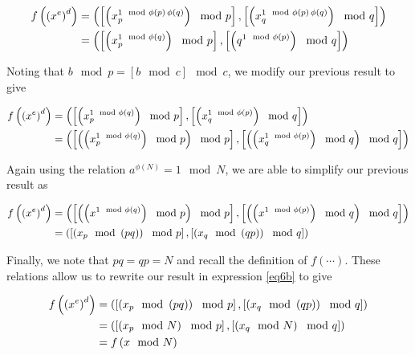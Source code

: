 \documentclass[../CryptoHW3.tex]{subfiles}
\begin{document}
\begin{flushleft}
\begin{align}
  f \left( \left( x^e \right)^d \right) &= \left( \left[ \left( x_p^{1 \mod \phi \left( p \right) \, \phi \left( q \right)} \right) \mod p \right], \left[ \left( x_	q^{1 \mod \phi \left( p \right) \, \phi \left( q \right)} \right) \mod q \right] \right) \notag \\
  &= \left( \left[ \left( x_p^{1 \mod \phi \left( q \right)} \right) \mod p \right], \left[ \left( q^{1 \mod \phi \left( p \right)} \right) \mod q \right] \right) \notag
\end{align}

Noting that $b \mod p = \left[ b \mod c \right] \mod c$, we modify our previous result to give

\begin{align}
  f \left( \left( x^e \right)^d \right) &= \left( \left[ \left( x_p^{1 \mod \phi \left( q \right)} \right) \mod p \right], \left[ \left( x_q^{1 \mod \phi \left( p \right)} \right) \mod q \right] \right) \notag \\
  &= \left( \left[ \left( \left( x_p^{1 \mod \phi \left( q \right)} \right) \mod p \right) \mod p \right], \left[ \left( \left( x_q^{1 \mod \phi \left( p \right)} \right) \mod q \right) \mod q \right] \right) \notag
\end{align}

Again using the relation $a^{\phi \left( N \right)} = 1 \mod N$, we are able to simplify our previous result as

\begin{align}
  f \left( \left( x^e \right)^d \right) &= \left( \left[ \left( \left( x^{1 \mod \phi \left( q \right)} \right) \mod p \right) \mod p \right], \left[ \left( \left( x^{1 \mod \phi \left( p \right)} \right) \mod q \right) \mod q \right] \right) \notag \\
  &= \left( \left[ \left( x_p \mod \left( p q \right) \right) \mod p \right], \left[ \left( x_q \mod \left( q p \right) \right) \mod q \right] \right) \label{eq6b}
\end{align}

Finally, we note that $p q = q p = N$ and recall the definition of $f \left( \cdots \right)$.  These relations allow us to rewrite our result in expression \ref{eq6b} to give

\begin{align}
  f \left( \left( x^e \right)^d \right) &= \left( \left[ \left( x_p \mod \left( p q \right) \right) \mod p \right], \left[ \left( x_q \mod \left( q p \right) \right) \mod q \right] \right) \notag \\
  &= \left( \left[ \left( x_p \mod N \right) \mod p \right], \left[ \left( x_q \mod N \right) \mod q \right] \right) \notag \\
  &= f \left( x \mod N \right) \notag
\end{align}


\end{flushleft}
\end{document}
